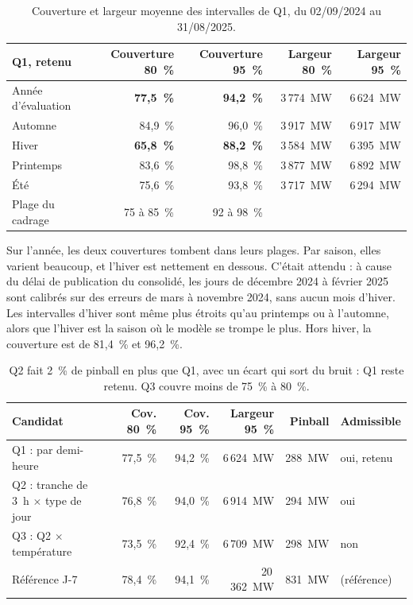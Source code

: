 \documentclass[11pt,a4paper]{article}
\begin{document}
\begin{table}[H]
\small
\begin{tabularx}{\linewidth}{Yrrrr}
\toprule
\textbf{Q1, retenu} & \textbf{Couverture 80~\%} & \textbf{Couverture 95~\%} & \textbf{Largeur 80~\%} & \textbf{Largeur 95~\%} \\
\midrule
Année d'évaluation & \textbf{77,5~\%} & \textbf{94,2~\%} & 3\,774~MW & 6\,624~MW \\
Automne & 84,9~\% & 96,0~\% & 3\,917~MW & 6\,917~MW \\
Hiver & \textbf{65,8~\%} & \textbf{88,2~\%} & 3\,584~MW & 6\,395~MW \\
Printemps & 83,6~\% & 98,8~\% & 3\,877~MW & 6\,892~MW \\
Été & 75,6~\% & 93,8~\% & 3\,717~MW & 6\,294~MW \\
\midrule
Plage du cadrage & 75 à 85~\% & 92 à 98~\% & & \\
\bottomrule
\end{tabularx}
\caption{Couverture et largeur moyenne des intervalles de Q1, du 02/09/2024 au 31/08/2025.}
\end{table}

Sur l'année, les deux couvertures tombent dans leurs plages. Par saison, elles varient beaucoup, et l'hiver est nettement en dessous. C'était attendu : à cause du délai de publication du consolidé, les jours de décembre 2024 à février 2025 sont calibrés sur des erreurs de mars à novembre 2024, sans aucun mois d'hiver. Les intervalles d'hiver sont même plus étroits qu'au printemps ou à l'automne, alors que l'hiver est la saison où le modèle se trompe le plus. Hors hiver, la couverture est de 81,4~\% et 96,2~\%.

\begin{table}[H]
\small
\begin{tabularx}{\linewidth}{Yrrrrl}
\toprule
\textbf{Candidat} & \textbf{Cov. 80~\%} & \textbf{Cov. 95~\%} & \textbf{Largeur 95~\%} & \textbf{Pinball} & \textbf{Admissible} \\
\midrule
Q1 : par demi-heure & 77,5~\% & 94,2~\% & 6\,624~MW & 288~MW & oui, retenu \\
Q2 : tranche de 3~h $\times$ type de jour & 76,8~\% & 94,0~\% & 6\,914~MW & 294~MW & oui \\
Q3 : Q2 $\times$ température & 73,5~\% & 92,4~\% & 6\,709~MW & 298~MW & non \\
Référence J-7 & 78,4~\% & 94,1~\% & 20\,362~MW & 831~MW & (référence) \\
\bottomrule
\end{tabularx}
\caption{Q2 fait 2~\% de pinball en plus que Q1, avec un écart qui sort du bruit : Q1 reste retenu. Q3 couvre moins de 75~\% à 80~\%.}
\end{table}
\end{document}
